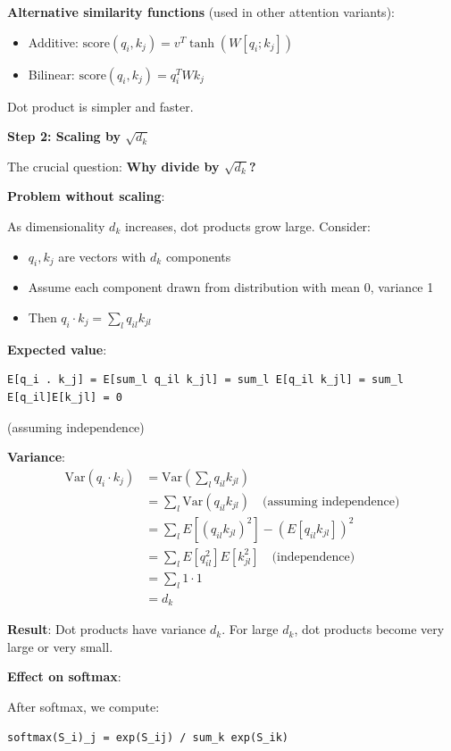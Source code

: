 \textbf{Alternative similarity functions} (used in other attention variants):
\begin{itemize}
\item Additive: $\text{score}(q_i, k_j) = v^T \tanh(W[q_i; k_j])$
\item Bilinear: $\text{score}(q_i, k_j) = q_i^T W k_j$
\end{itemize}

Dot product is simpler and faster.

\textbf{Step 2: Scaling by $\sqrt{d_k}$}

The crucial question: \textbf{Why divide by $\sqrt{d_k}$?}

\textbf{Problem without scaling}:

As dimensionality $d_k$ increases, dot products grow large. Consider:
\begin{itemize}
\item $q_i, k_j$ are vectors with $d_k$ components
\item Assume each component drawn from distribution with mean 0, variance 1
\item Then $q_i \cdot k_j = \sum_l q_{il} k_{jl}$
\end{itemize}

\textbf{Expected value}:
\begin{verbatim}
E[q_i . k_j] = E[sum_l q_il k_jl] = sum_l E[q_il k_jl] = sum_l E[q_il]E[k_jl] = 0
\end{verbatim}
(assuming independence)

\textbf{Variance}:
\begin{align*}
\text{Var}(q_i \cdot k_j) &= \text{Var}\left(\sum_l q_{il} k_{jl}\right) \\
             &= \sum_l \text{Var}(q_{il} k_{jl})  \quad \text{(assuming independence)} \\
             &= \sum_l E[(q_{il} k_{jl})^2] - (E[q_{il} k_{jl}])^2 \\
             &= \sum_l E[q_{il}^2]E[k_{jl}^2]  \quad \text{(independence)} \\
             &= \sum_l 1 \cdot 1 \\
             &= d_k
\end{align*}

\textbf{Result}: Dot products have variance $d_k$. For large $d_k$, dot products become very large or very small.

\textbf{Effect on softmax}:

After softmax, we compute:
\begin{verbatim}
softmax(S_i)_j = exp(S_ij) / sum_k exp(S_ik)
\end{verbatim}

